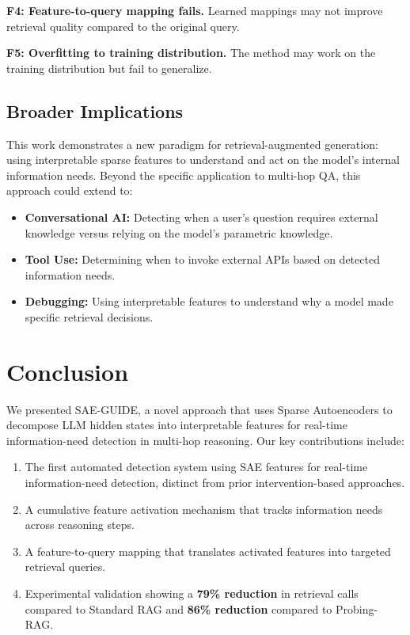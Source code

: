 \documentclass{article}
\newcommand{\ours}{SAE-GUIDE}
\begin{document}
\textbf{F4: Feature-to-query mapping fails.} Learned mappings may not improve retrieval quality compared to the original query.

\textbf{F5: Overfitting to training distribution.} The method may work on the training distribution but fail to generalize.

\subsection{Broader Implications}

This work demonstrates a new paradigm for retrieval-augmented generation: using interpretable sparse features to understand and act on the model's internal information needs. Beyond the specific application to multi-hop QA, this approach could extend to:

\begin{itemize}
    \item \textbf{Conversational AI:} Detecting when a user's question requires external knowledge versus relying on the model's parametric knowledge.
    \item \textbf{Tool Use:} Determining when to invoke external APIs based on detected information needs.
    \item \textbf{Debugging:} Using interpretable features to understand why a model made specific retrieval decisions.
\end{itemize}

\section{Conclusion}
\label{sec:conclusion}

We presented \ours, a novel approach that uses Sparse Autoencoders to decompose LLM hidden states into interpretable features for real-time information-need detection in multi-hop reasoning. Our key contributions include:

\begin{enumerate}
    \item The first automated detection system using SAE features for real-time information-need detection, distinct from prior intervention-based approaches.
    \item A cumulative feature activation mechanism that tracks information needs across reasoning steps.
    \item A feature-to-query mapping that translates activated features into targeted retrieval queries.
    \item Experimental validation showing a \textbf{79\% reduction} in retrieval calls compared to Standard RAG and \textbf{86\% reduction} compared to Probing-RAG.
\end{enumerate}
\end{document}
